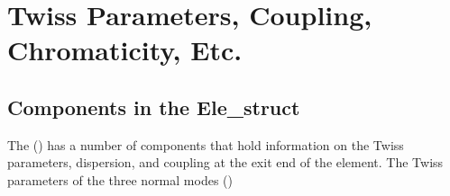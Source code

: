 \chapter{Twiss Parameters, Coupling, Chromaticity, Etc.}
\label{c:twiss}

\section{Components in the Ele\_struct}
\label{s:twiss.ele}

The  () has a number of components that
hold information on the Twiss parameters, dispersion, and coupling
at the exit end of the element. The Twiss parameters of the three 
normal modes ()
